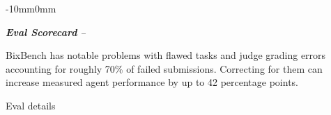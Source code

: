 \begin{maincontentstyled}



{}
\label{sec:scorecard}

\begin{adjustwidth}{-10mm}{0mm}

\noindent
\begin{minipage}[c]{0.78\linewidth}
  {\LARGE\itshape \textbf{Eval Scorecard} -- \evaltitle}
\end{minipage}%
\hfill
\begin{minipage}[c]{0.18\linewidth}
  \raggedleft\gradebadge{\eevalscore}
\end{minipage}

\vspace{2pt}

\noindent
BixBench has notable problems with flawed tasks and judge grading errors accounting for roughly 70\% of failed submissions. Correcting for them can increase measured agent performance by up to 42 percentage points.

\vspace{2pt}

\noindent
\begin{dsbox}[top=1mm, bottom=1mm, before skip=4pt, after skip=4pt]{Eval details}
\end{dsbox}

\smallskip

\scorecardbreakdown


\end{adjustwidth}
\end{maincontentstyled}
